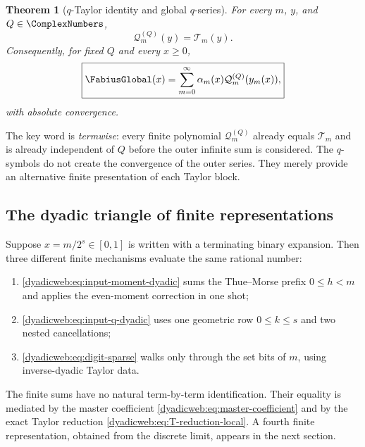 \documentclass[11pt,oneside]{article}
\newtheorem{theorem}{Theorem}[section]
\theoremstyle{definition}
\theoremstyle{remark}
\begin{document}
\begin{theorem}[$q$-Taylor identity and global $q$-series]
\label{dyadicweb:thm:q-global-local}
For every $m$, $y$, and $Q\in\ComplexNumbers$,
\begin{equation}
 \mathcal Q_m^{(Q)}(y)=\mathcal T_m(y).                   \label{dyadicweb:eq:Qm-equals-Tm-local}
\end{equation}
Consequently, for fixed $Q$ and every $x\ge0$,
\begin{equation}
 \boxed{
 \FabiusGlobal(x)=\sum_{m=0}^{\infty}
 \alpha_m(x)\mathcal Q_m^{(Q)}(y_m(x)),}                 \label{dyadicweb:eq:global-q-series-local}
\end{equation}
with absolute convergence.
\end{theorem}

The key word is \emph{termwise}: every finite polynomial
$\mathcal Q_m^{(Q)}$ already equals $\mathcal T_m$ and is already independent of $Q$ before
the outer infinite sum is considered.  The $q$-symbols do not create the convergence of the
outer series.  They merely provide an alternative finite presentation of each Taylor block.

\subsection{The dyadic triangle of finite representations}

Suppose $x=m/2^s\in[0,1]$ is written with a terminating binary expansion.  Then three different
finite mechanisms evaluate the same rational number:
\begin{enumerate}
\item \eqref{dyadicweb:eq:input-moment-dyadic} sums the Thue--Morse prefix $0\le h<m$ and applies the
      even-moment correction in one shot;
\item \eqref{dyadicweb:eq:input-q-dyadic} uses one geometric row $0\le k\le s$ and two nested
      cancellations;
\item \eqref{dyadicweb:eq:digit-sparse} walks only through the set bits of $m$, using inverse-dyadic
      Taylor data.
\end{enumerate}
The finite sums have no natural term-by-term identification.  Their equality is mediated by
the master coefficient \eqref{dyadicweb:eq:master-coefficient} and by the exact Taylor reduction
\eqref{dyadicweb:eq:T-reduction-local}.  A fourth finite representation, obtained from the discrete
limit, appears in the next section.
\end{document}
